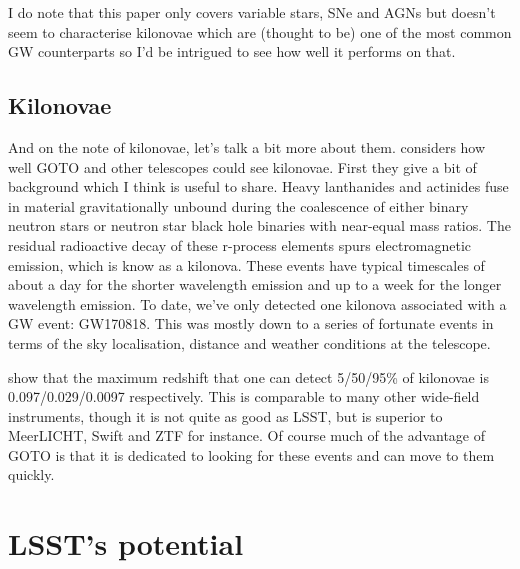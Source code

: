 \documentclass[twocolumn]{aastex631}
\newcommand{\placeholder}[1]{{\color{gray} \lipsum[#1]}}
\begin{document}
I do note that this paper only covers variable stars, SNe and AGNs but doesn't seem to characterise kilonovae which are (thought to be) one of the most common GW counterparts so I'd be intrigued to see how well it performs on that.

\subsection{Kilonovae}
And on the note of kilonovae, let's talk a bit more about them. \citet{Chase+2022} considers how well GOTO and other telescopes could see kilonovae. First they give a bit of background which I think is useful to share. Heavy lanthanides and actinides fuse in material gravitationally unbound during the coalescence of either binary neutron stars or neutron star black hole binaries with near-equal mass ratios. The residual radioactive decay of these r-process elements spurs electromagnetic emission, which is know as a kilonova. These events have typical timescales of about a day for the shorter wavelength emission and up to a week for the longer wavelength emission. To date, we've only detected one kilonova associated with a GW event: GW170818. This was mostly down to a series of fortunate events in terms of the sky localisation, distance and weather conditions at the telescope.

\citet{Chase+2022} show that the maximum redshift that one can detect 5/50/95\% of kilonovae is 0.097/0.029/0.0097 respectively. This is comparable to many other wide-field instruments, though it is not quite as good as LSST, but is superior to MeerLICHT, Swift and ZTF for instance. Of course much of the advantage of GOTO is that it is dedicated to looking for these events and can move to them quickly.
 
\section{LSST's potential}
\citet{Andreoni+2022}
\placeholder{8}


{}
\end{document}
